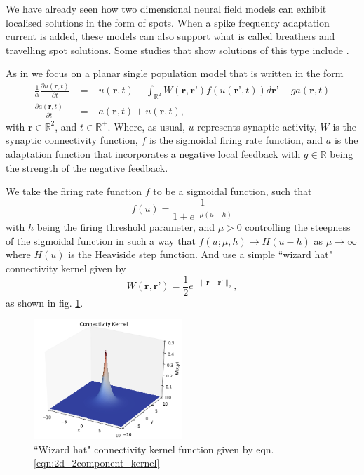 \documentclass{uonmathreport}
\begin{document}
We have already seen how two dimensional neural field models can exhibit localised solutions in the form of spots. When a spike frequency adaptation current is added, these models can also support what is called breathers and travelling spot solutions. Some studies that show solutions of this type include \cite{ermentrout2014spatiotemporal,coombes2003waves,coombes2014spots,laingatwo}.

As in \cite{coombes2014spots} we focus on a planar single population model that is written in the form
\begin{subequations}\label{eqn:2d_2component_gral}
	\begin{align}
		\frac{1}{\alpha} \frac{\partial u(\textbf{r},t)}{\partial t} &= -u(\textbf{r},t) + \int_{\mathbb{R}^2} W(\textbf{r},\textbf{r'})f(u(\textbf{r'},t)) d\textbf{r'} - g a(\textbf{r},t)\\
		\frac{\partial a(\textbf{r},t)}{\partial t} &= -a(\textbf{r},t) + u(\textbf{r},t),
	\end{align}
\end{subequations}
with $\textbf{r} \in \mathbb{R}^2$, and $t \in \mathbb{R}^+$. Where, as usual, $u$ represents synaptic activity, $W$ is the synaptic connectivity function, $f$ is the sigmoidal firing rate function, and $a$ is the adaptation function that incorporates a negative local feedback with $g \in \mathbb{R}$ being the strength of the negative feedback.

We take the firing rate function $f$ to be a sigmoidal function, such that
\begin{equation}\label{eqn:2d_2component_frate}
	f(u) = \frac{1}{1+e^{-\mu (u-h)}}
\end{equation}
with $h$ being the firing threshold parameter, and $\mu>0$ controlling the steepness of the sigmoidal function in such a way that $f(u;\mu, h) \rightarrow H(u-h)$ as $\mu \rightarrow \infty$ where $H(u)$ is the Heaviside step function.
And use a simple ``wizard hat" connectivity kernel given by
\begin{equation}\label{eqn:2d_2component_kernel}
	W(\textbf{r},\textbf{r'}) = \frac{1}{2}e^{-\| \textbf{r} - \textbf{r'}\|_2},
\end{equation}
as shown in fig. \ref{fig:2d_2component_kernel}.
\begin{figure}[H]
	\begin{center}
		\includegraphics[width=0.5\textwidth]{Figures/2D_Wizard_Hat_Kernel.png}
	\end{center}
	\caption{``Wizard hat" connectivity kernel function given by eqn. \ref{eqn:2d_2component_kernel}}
	\label{fig:2d_2component_kernel}
\end{figure}
\end{document}
